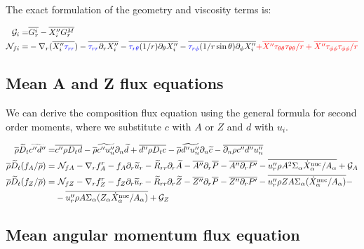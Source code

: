 \documentclass[10pt,paper=a4]{report}
\newcommand{\eht}{\overline}
\newcommand{\fht}{\widetilde}
\newcommand{\fav}{\widetilde}
\def\erho{\eht{\rho}}
\begin{document}
\noindent
The exact formulation of the geometry and viscosity terms is:

\begin{align}
{\mathcal G_i} = & {\eht{G_{r}^i} - \eht{X''_i G_r^M}}\\
{\mathcal N_{fi}} = &-\nabla_r (\eht{X''_i {\color{blue}\tau_{rr}}}) - \eht{{\color{blue}\tau_{rr}}\partial_r X''_i} - \eht{{\color{blue}\tau_{r\theta}}(1/r)\partial_\theta X''_i} - \eht{{\color{blue}\tau_{r\phi}}(1/r\sin{\theta})\partial_\phi X''_i}  {\color{red} +\overline{X''\tau_{\theta \theta} \tau_{\theta \theta}/r} + \overline{X''\tau_{\phi \phi} \tau_{\phi \phi}/r}}  
\end{align}



\subsection{Mean A and Z flux equations}

We can derive the composition flux equation using the general formula for second order moments, where we substitute $c$ with $A$ or $Z$ and $d$ with $u_i$.

\begin{align}
\overline{\rho}\widetilde{D}_t \widetilde{c''d''} = & \overline{c'' \rho D_t d} - \overline{\rho} \widetilde{c''u''_n}\partial_n \widetilde{d} + \overline{d'' \rho D_t c} - \overline{\rho} \widetilde{d''u''_n}\partial_n \widetilde{c} - \overline{\partial_n \rho c''d''u''_n} \\
\erho \fav{D}_t (f_A / \eht{\rho}) = &  \ {\mathcal N_{fA}} -\nabla_r f_A^r - f_A \partial_r \fht{u}_r - \fht{R}_{rr} \partial_r \fht{A} -\eht{A''} \partial_r \eht{P} - \eht{A'' \partial_r P'} - \overline{u''_r \rho A^2\Sigma_\alpha \dot{X}_\alpha^{\rm nuc} / A_\alpha} + {\mathcal G_A}                 \label{eq:rans_fabar} \\
\erho \fav{D}_t (f_Z / \eht{\rho}) = &  \ {\mathcal N_{fZ}} -\nabla_r f_Z^r  - f_Z \partial_r \fht{u}_r - \fht{R}_{rr} \partial_r \fht{Z} -\eht{Z''} \partial_r \eht{P} - \eht{Z'' \partial_r P'} - \overline{u''_r \rho Z A \Sigma_\alpha (\dot{X}_\alpha^{\rm nuc}/ A_\alpha)} - \nonumber \\
& - \overline{u''_r \rho A \Sigma_\alpha (Z_\alpha \dot{X}_\alpha^{\rm nuc} / A_\alpha)}  + {\mathcal G_Z}   \label{eq:rans_fzbar} 
\end{align}

\subsection{Mean angular momentum flux equation}
\end{document}

